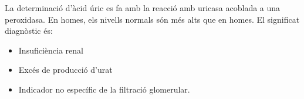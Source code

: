 La determinació d'àcid úric es fa amb la reacció amb uricasa acoblada a una peroxidasa. En homes, els nivells normals són més alts que en homes. El significat diagnòstic és:
\begin{itemize}
\item Insuficiència renal
\item Excés de producció d'urat
\item Indicador no específic de la filtració glomerular.
\end{itemize}